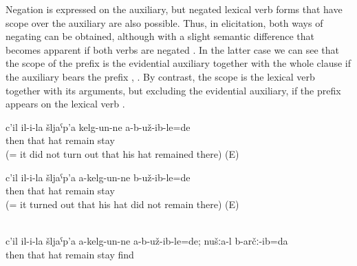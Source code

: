 Negation is expressed on the auxiliary, but negated lexical verb forms that have scope over the auxiliary are also possible. Thus, in elicitation, both ways of negating can be obtained, although with a slight semantic difference that becomes apparent if both verbs are negated . In the latter case we can see that the scope of the  prefix is the evidential auxiliary together with the whole clause if the auxiliary bears the prefix , . By contrast, the scope is the lexical verb together with its arguments, but excluding the evidential auxiliary, if the prefix appears on the lexical verb .

\begin{exe}
		\ex	\label{ex:Then (apparently) his hat did not remain there@14a}
		\gll	c'il	il-i-la	šljaˁp'a	kelg-un-ne	a-b-už-ib-le=de\\
			then	that	hat	remain	stay\\
		\glt	{} (= it did not turn out that his hat remained there) (E)

		\ex	\label{ex:Then (apparently) his hat did not remain there@14b}
		\gll	c'il	il-i-la	šljaˁp'a	a-kelg-un-ne	b-už-ib-le=de\\
			then	that	hat	remain	stay\\
		\glt	{} (= it turned out that his hat did not remain there) (E)

		\\\label{ex:Then it did not turn out that his hat did not remain there, but (by contrast) we found it (there)@14c}%
		\gll	c'il	il-i-la	šljaˁp'a	a-kelg-un-ne	a-b-už-ib-le=de; nušːa-l	b-arčː-ib=da\\
			then	that	hat	remain	stay		find\\
		\glt	{}
\end{exe}


